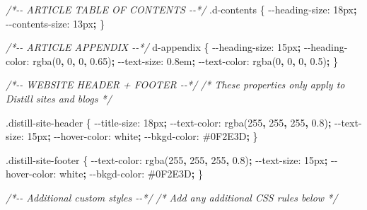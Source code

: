 \documentclass[
]{book}
\newenvironment{Shaded}{\begin{snugshade}}{\end{snugshade}}
\newcommand{\CommentTok}[1]{\textcolor[rgb]{0.56,0.35,0.01}{\textit{#1}}}
\newcommand{\ConstantTok}[1]{\textcolor[rgb]{0.00,0.00,0.00}{#1}}
\newcommand{\DataTypeTok}[1]{\textcolor[rgb]{0.13,0.29,0.53}{#1}}
\newcommand{\DecValTok}[1]{\textcolor[rgb]{0.00,0.00,0.81}{#1}}
\newcommand{\FunctionTok}[1]{\textcolor[rgb]{0.00,0.00,0.00}{#1}}
\newcommand{\NormalTok}[1]{#1}
\newcommand{\OperatorTok}[1]{\textcolor[rgb]{0.81,0.36,0.00}{\textbf{#1}}}
\newcommand{\VariableTok}[1]{\textcolor[rgb]{0.00,0.00,0.00}{#1}}
\begin{document}
\begin{Shaded}
\begin{Highlighting}[]
\CommentTok{/*{-}{-} ARTICLE TABLE OF CONTENTS {-}{-}*/}
\FunctionTok{.d{-}contents}\NormalTok{ \{}
  \VariableTok{{-}{-}heading{-}size}\NormalTok{:    }\DecValTok{18}\DataTypeTok{px}\OperatorTok{;}
  \VariableTok{{-}{-}contents{-}size}\NormalTok{:   }\DecValTok{13}\DataTypeTok{px}\OperatorTok{;}
\NormalTok{\}}

\CommentTok{/*{-}{-} ARTICLE APPENDIX {-}{-}*/}
\NormalTok{d{-}appendix \{}
  \VariableTok{{-}{-}heading{-}size}\NormalTok{:    }\DecValTok{15}\DataTypeTok{px}\OperatorTok{;}
  \VariableTok{{-}{-}heading{-}color}\NormalTok{:   }\FunctionTok{rgba(}\DecValTok{0}\OperatorTok{,} \DecValTok{0}\OperatorTok{,} \DecValTok{0}\OperatorTok{,} \DecValTok{0.65}\FunctionTok{)}\OperatorTok{;}
  \VariableTok{{-}{-}text{-}size}\NormalTok{:       }\DecValTok{0.8}\DataTypeTok{em}\OperatorTok{;}
  \VariableTok{{-}{-}text{-}color}\NormalTok{:      }\FunctionTok{rgba(}\DecValTok{0}\OperatorTok{,} \DecValTok{0}\OperatorTok{,} \DecValTok{0}\OperatorTok{,} \DecValTok{0.5}\FunctionTok{)}\OperatorTok{;}
\NormalTok{\}}

\CommentTok{/*{-}{-} WEBSITE HEADER + FOOTER {-}{-}*/}
\CommentTok{/* These properties only apply to Distill sites and blogs  */}

\FunctionTok{.distill{-}site{-}header}\NormalTok{ \{}
  \VariableTok{{-}{-}title{-}size}\NormalTok{:       }\DecValTok{18}\DataTypeTok{px}\OperatorTok{;}
  \VariableTok{{-}{-}text{-}color}\NormalTok{:       }\FunctionTok{rgba(}\DecValTok{255}\OperatorTok{,} \DecValTok{255}\OperatorTok{,} \DecValTok{255}\OperatorTok{,} \DecValTok{0.8}\FunctionTok{)}\OperatorTok{;}
  \VariableTok{{-}{-}text{-}size}\NormalTok{:        }\DecValTok{15}\DataTypeTok{px}\OperatorTok{;}
  \VariableTok{{-}{-}hover{-}color}\NormalTok{:      }\ConstantTok{white}\OperatorTok{;}
  \VariableTok{{-}{-}bkgd{-}color}\NormalTok{:       }\ConstantTok{\#0F2E3D}\OperatorTok{;}
\NormalTok{\}}

\FunctionTok{.distill{-}site{-}footer}\NormalTok{ \{}
  \VariableTok{{-}{-}text{-}color}\NormalTok{:       }\FunctionTok{rgba(}\DecValTok{255}\OperatorTok{,} \DecValTok{255}\OperatorTok{,} \DecValTok{255}\OperatorTok{,} \DecValTok{0.8}\FunctionTok{)}\OperatorTok{;}
  \VariableTok{{-}{-}text{-}size}\NormalTok{:        }\DecValTok{15}\DataTypeTok{px}\OperatorTok{;}
  \VariableTok{{-}{-}hover{-}color}\NormalTok{:      }\ConstantTok{white}\OperatorTok{;}
  \VariableTok{{-}{-}bkgd{-}color}\NormalTok{:       }\ConstantTok{\#0F2E3D}\OperatorTok{;}
\NormalTok{\}}

\CommentTok{/*{-}{-} Additional custom styles {-}{-}*/}
\CommentTok{/* Add any additional CSS rules below                      */}
\end{Highlighting}
\end{Shaded}
\end{document}
